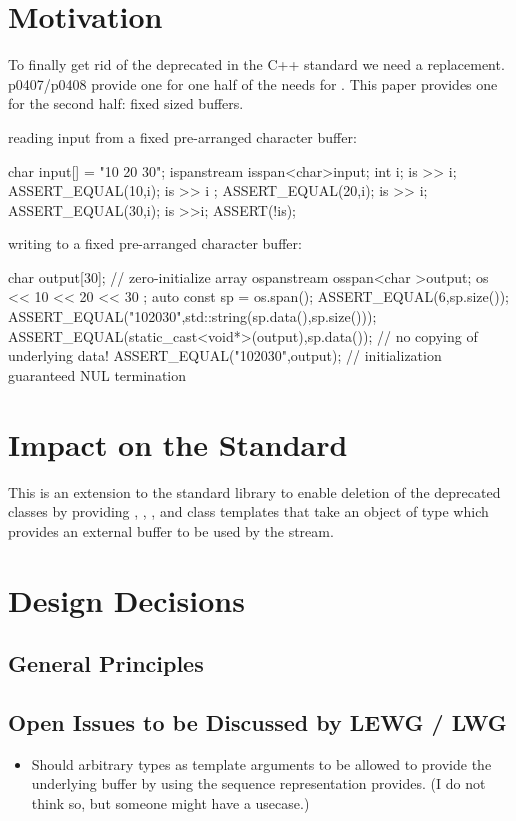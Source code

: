 \documentclass[ebook,11pt,article]{memoir}
\begin{document}
\chapter{Motivation}
To finally get rid of the deprecated  in the C++ standard we need a replacement. p0407/p0408 provide one for one half of the needs for . This paper provides one for the second half: fixed sized buffers. 

\begin{example} reading input from a fixed pre-arranged character buffer:
\begin{codeblock}
char input[] = "10 20 30";
ispanstream is{span<char>{input}};
int i;
is >> i;
ASSERT_EQUAL(10,i);
is >> i ;
ASSERT_EQUAL(20,i);
is >> i;
ASSERT_EQUAL(30,i);
is >>i;
ASSERT(!is);
\end{codeblock}
\end{example}
\begin{example} writing to a fixed pre-arranged character buffer:
\begin{codeblock}
char  output[30]{}; // zero-initialize array
ospanstream os{span<char >{output}};
os << 10 << 20 << 30 ;
auto const sp = os.span();
ASSERT_EQUAL(6,sp.size());
ASSERT_EQUAL("102030",std::string(sp.data(),sp.size()));
ASSERT_EQUAL(static_cast<void*>(output),sp.data()); // no copying of underlying data!
ASSERT_EQUAL("102030",output); // initialization guaranteed NUL termination
\end{codeblock}
\end{example}

\chapter{Impact on the Standard}
This is an extension to the standard library to enable deletion of the deprecated  classes by providing , , , and  class templates that take an object of type  which provides an external buffer to be used by the stream. 

\chapter{Design Decisions}
\section{General Principles}
\section{Open Issues to be Discussed by LEWG / LWG}
\begin{itemize}
\item Should arbitrary types as template arguments to  be allowed to provide the underlying buffer by using the  sequence representation  provides. (I do not think so, but someone might have a usecase.)
\end{itemize}
\end{document}
